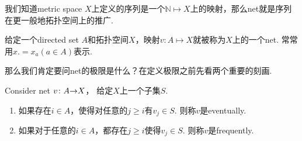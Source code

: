 我们知道metric space $X$上定义的序列是一个$\mathbb{N} \mapsto X$上的映射，那么net就是序列在更一般地拓扑空间上的推广.

\begin{definition}
给定一个directed set $A$和拓扑空间$X$，映射$v \colon A \mapsto X$就被称为$X$上的一个net.  常常用$x.= x_a(a\in A)$表示.
\end{definition}

那么我们肯定要问net的极限是什么？在定义极限之前先看两个重要的刻画.
\begin{definition}
Consider net ${v}\colon{A}{\to}{X}$， 给定$X$上一个子集$S$. 
\begin{enumerate}
	\item 如果存在$i \in A$，使得对任意的$j \geq i$有$v_j \in S$. 则称$v$是eventually.
	\item 如果对于任意的$i \in A$，都存在$j \geq i$使得$v_j \in S$. 则称$v$是frequently.
\end{enumerate}
\end{definition}




